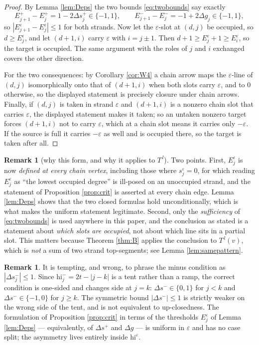 \documentclass[reqno]{amsart}
\theoremstyle{plain}
\theoremstyle{definition}
\newtheorem{remark}[theorem]{Remark}
\newcommand{\eps}{\varepsilon}
\newcommand{\hi}{\mathrm{hi}}
\begin{document}
\begin{proof}
By Lemma \ref{lem:Deps} the two bounds \eqref{eq:twobounds} say exactly
\[
   E^{+}_{j+1}-E^{+}_j=1-2\Delta s^{+}_j\in\{-1,1\},
   \qquad
   E^{-}_{j+1}-E^{-}_j=-1+2\Delta g_j\in\{-1,1\},
\]
so $|E^{\eps}_{j+1}-E^{\eps}_j|\le1$ for both strands.  Now let the
$\eps$-slot at $(d,j)$ be occupied, so $d\ge E^{\eps}_j$, and let $(d+1,i)$
carry $\eps$ with $i=j\pm1$.  Then
$d+1\ge E^{\eps}_j+1\ge E^{\eps}_i$, so the target is occupied.  The same
argument with the roles of $j$ and $i$ exchanged covers the other direction.

For the two consequences: by Corollary \ref{cor:W4} a chain arrow maps the
$\eps$-line of $(d,j)$ isomorphically onto that of $(d+1,i)$ when both slots
carry $\eps$, and to $0$ otherwise, so the displayed statement is precisely
closure under chain arrows.  Finally, if $(d,j)$ is taken in strand $\eps$ and
$(d+1,i)$ is a nonzero chain slot that carries $\eps$, the displayed statement
makes it taken; so an untaken nonzero target forces $(d+1,i)$ not to carry
$\eps$, which at a chain slot means it carries only $-\eps$.  If the source is
full it carries $-\eps$ as well and is occupied there, so the target is taken
after all.
\end{proof}

\begin{remark}[why this form, and why it applies to $T^{\,l}$]
\label{rem:critform}
Two points.  First, $E^{\eps}_j$ is now \emph{defined at every chain vertex},
including those where $s^{\eps}_j=0$, for which reading $E^{\eps}_j$ as
``the lowest occupied degree'' is ill-posed on an unoccupied strand, and the
statement of Proposition \ref{prop:crit} is asserted at every chain edge.
Lemma \ref{lem:Deps} shows that the two closed formulas hold unconditionally,
which is what makes the uniform statement legitimate.  Second, only the
\emph{sufficiency} of \eqref{eq:twobounds} is used anywhere in this paper, and
the conclusion as stated is a statement about \emph{which slots are occupied},
not about which line sits in a partial slot.  This matters because Theorem
\ref{thm:B} applies the conclusion to $T^{\,l}(v)$, which is \emph{not} a sum
of two strand top-segments; see Lemma \ref{lem:samepattern}.
\end{remark}

\begin{remark}
It is tempting, and wrong, to phrase the minus condition as
$|\Delta s^{-}_j|\le1$.  Since $\hi^{-}_j=2t-|j-k|$ is a tent rather than a
ramp, the correct condition is one-sided and changes side at $j=k$:
$\Delta s^-\in\{0,1\}$ for $j<k$ and $\Delta s^-\in\{-1,0\}$ for $j\ge k$.  The
symmetric bound $|\Delta s^-|\le1$ is strictly weaker on the wrong side of the
tent, and is not equivalent to up-closedness.  The formulation of Proposition
\ref{prop:crit} in terms of the thresholds $E^{\eps}_j$ of Lemma \ref{lem:Deps}
--- equivalently, of $\Delta s^{+}$ and $\Delta g$ --- is uniform in $\eps$ and
has no case split; the asymmetry lives entirely inside $\hi^{\eps}$.
\end{remark}
\end{document}
